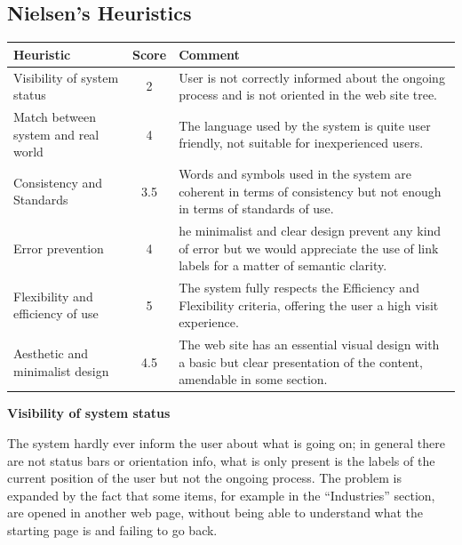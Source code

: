 \subsection{Nielsen's Heuristics}
\begin{table}[H]
  \begin{center}
    \label{tab:table1}
    \begin{tabular}{||l|c|p{8cm}||} %
      \textbf{Heuristic} & \textbf{Score} & \textbf{Comment}\\
      
      \hline
      Visibility of system status & 2 & User is not correctly informed about the ongoing process and is not oriented in the web site tree.\\
      \hline
      Match between system and real world & 4 & The language used by the system is quite user friendly, not suitable for inexperienced users.\\
      \hline
      Consistency and Standards & 3.5 & Words and symbols used in the system are coherent in terms of consistency but not enough in terms of standards of use.\\
      \hline
      Error prevention & 4 & he minimalist and clear design prevent any kind of error but we would appreciate the use of link labels for a matter of semantic clarity.\\
      \hline
      Flexibility and efficiency of use & 5 & The system fully respects the Efficiency and Flexibility criteria, offering the user a high visit experience.\\
      \hline
      Aesthetic and minimalist design & 4.5 & The web site has an essential visual design with a basic but clear presentation of the content, amendable in some section.\\
    \end{tabular}
  \end{center}
\end{table}

\medskip

\textbf{Visibility of system status }\par
The system hardly ever inform the user about what is going on; in general there are not status bars or orientation info, what is only present is the labels of the current position of the user but not the ongoing process. The problem is expanded by the fact that some items, for example in the “Industries” section, are opened in another web page, without being able to understand what the starting page is and failing to go back.  
\medskip

